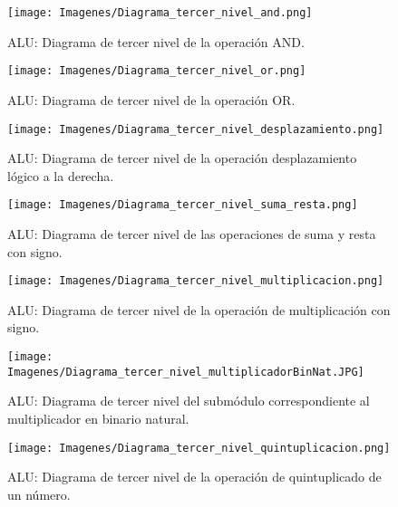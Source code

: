 \documentclass[journal,trans]{IEEEtran}
\begin{document}
\begin{figure}[h!]
	\centering
	\texttt{[image: Imagenes/Diagrama\_tercer\_nivel\_and.png]}
	\caption{ALU: Diagrama de tercer nivel de la operación AND.}
	\label{fig:Diagrama_tercer_nivel_and}
\end{figure}

\begin{figure}[h!]
	\centering
	\texttt{[image: Imagenes/Diagrama\_tercer\_nivel\_or.png]}
	\caption{ALU: Diagrama de tercer nivel de la operación OR.}
	\label{fig:Diagrama_tercer_nivel_or}
\end{figure}

\begin{figure}[h!]
	\centering
	\texttt{[image: Imagenes/Diagrama\_tercer\_nivel\_desplazamiento.png]}
	\caption{ALU: Diagrama de tercer nivel de la operación desplazamiento lógico a la derecha.}
	\label{fig:Diagrama_tercer_nivel_desplazamiento}
\end{figure}

\begin{figure}[h!]
	\centering
	\texttt{[image: Imagenes/Diagrama\_tercer\_nivel\_suma\_resta.png]}
	\caption{ALU: Diagrama de tercer nivel de las operaciones de suma y resta con signo.}
	\label{fig:Diagrama_tercer_nivel_suma_resta}
\end{figure}

\begin{figure}[h!]
	\centering
	\texttt{[image: Imagenes/Diagrama\_tercer\_nivel\_multiplicacion.png]}
	\caption{ALU: Diagrama de tercer nivel de la operación de multiplicación con signo.}
	\label{fig:Diagrama_tercer_nivel_multiplicacion}
\end{figure}

\begin{figure}[h!]
	\centering
	\texttt{[image: Imagenes/Diagrama\_tercer\_nivel\_multiplicadorBinNat.JPG]}
	\caption{ALU: Diagrama de tercer nivel del submódulo correspondiente al multiplicador en binario natural.}
	\label{fig:Diagrama_tercer_nivel_multiplicadorBinNat}
\end{figure}

\begin{figure}[h!]
	\centering
	\texttt{[image: Imagenes/Diagrama\_tercer\_nivel\_quintuplicacion.png]}
	\caption{ALU: Diagrama de tercer nivel de la operación de quintuplicado de un número.}
	\label{fig:Diagrama_tercer_nivel_quintuplicacion}
\end{figure}
\end{document}
